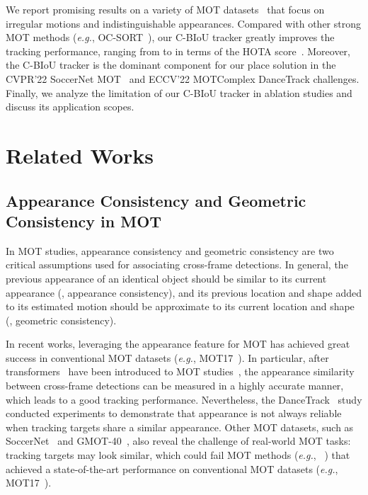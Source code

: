 \documentclass[journal]{IEEEtran}
\newcommand{\eg}{{\it e.g.}}
\begin{document}
We report promising results on a variety of MOT datasets~\cite{cioppa2022soccernet,deliege2021soccernet, bai2021gmot, sun2022dancetrack} that focus on irregular motions and indistinguishable appearances. Compared with other strong MOT methods (\eg, OC-SORT~\cite{cao2022observation}), our C-BIoU tracker greatly improves the tracking performance, ranging from  to  in terms of the HOTA score~\cite{luiten2020IJCV}. Moreover, the C-BIoU tracker is the dominant component for our  place solution in the CVPR'22 SoccerNet MOT~\cite{SoccerNet_tracking_2022} and  ECCV'22 MOTComplex DanceTrack challenges. Finally, we analyze the limitation of our C-BIoU tracker in ablation studies and discuss its application scopes.





\section{Related Works}


\subsection{Appearance Consistency and Geometric Consistency in MOT}


In MOT studies, appearance consistency and geometric consistency are two critical assumptions used for associating cross-frame detections. In general, the previous appearance of an identical object should be similar to its current appearance (\ie, appearance consistency), and its previous location and shape added to its estimated motion should be approximate to its current location and shape (\ie, geometric consistency).

In recent works, leveraging the appearance feature for MOT has achieved great success in conventional MOT datasets (\eg, MOT17~\cite{MOT16}). In particular, after transformers~\cite{vaswani2017attention} have been introduced to MOT studies~\cite{Transtrack, MOTR, Trackformer}, the appearance similarity between cross-frame detections can be measured in a highly accurate manner, which leads to a good tracking performance. Nevertheless, the DanceTrack~\cite{sun2022dancetrack} study conducted experiments to demonstrate that appearance is not always reliable when tracking targets share a similar appearance. Other MOT datasets, such as SoccerNet~\cite{cioppa2022soccernet,deliege2021soccernet} and GMOT-40~\cite{bai2021gmot}, also reveal the challenge of real-world MOT tasks: tracking targets may look similar, which could fail MOT methods (\eg, ~\cite{bytetrack}) that achieved a state-of-the-art performance on conventional MOT datasets (\eg, MOT17~\cite{MOT16}).
\end{document}
